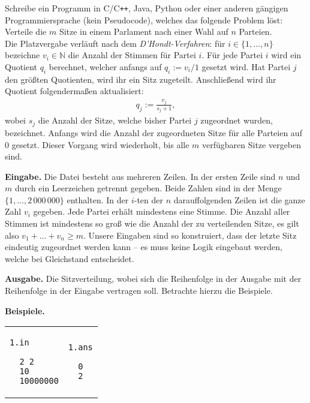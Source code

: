 \documentclass{uebung_cs}
\begin{document}
\begin{aufgabe}
  Schreibe ein Programm in C/C\texttt{++}, Java, Python oder einer anderen gängigen Programmiersprache (kein Pseudocode), welches das folgende Problem löst: 
  Verteile die $m$ Sitze in einem Parlament nach einer Wahl auf $n$ Parteien.\\[0.25cm]
  Die Platzvergabe verläuft nach dem \emph{D'Hondt-Verfahren}:
  für $i \in \{1, \dots, n\}$ bezeichne $v_i \in \mathbb N$ die Anzahl der Stimmen für Partei $i$.
  Für jede Partei $i$ wird ein Quotient $q_i$ berechnet, welcher anfangs auf $q_i := v_i/1$ gesetzt wird.
  Hat Partei $j$ den größten Quotienten, wird ihr ein Sitz zugeteilt.
  Anschließend wird ihr Quotient folgendermaßen aktualisiert:
  \begin{align*}
      q_j := \frac{v_j}{s_j + 1},
  \end{align*}
  wobei $s_j$ die Anzahl der Sitze, welche bisher Partei $j$ zugeordnet wurden, bezeichnet.
  Anfangs wird die Anzahl der zugeordneten Sitze für alle Parteien auf $0$ gesetzt.
  Dieser Vorgang wird wiederholt, bis alle $m$ verfügbaren Sitze vergeben sind.
  
  \textbf{Eingabe.}
  Die Datei besteht aus mehreren Zeilen.
  In der ersten Zeile sind $n$ und $m$ durch ein Leerzeichen getrennt gegeben.
  Beide Zahlen sind in der Menge $\{1, \dots, 2\,000\,000\}$ enthalten.
  In der $i$-ten der $n$ darauffolgenden Zeilen ist die ganze Zahl $v_i$ gegeben.
  Jede Partei erhält mindestens eine Stimme.
  Die Anzahl aller Stimmen ist mindestens so groß wie die Anzahl der zu verteilenden Sitze, es gilt also $v_1 + \dots + v_n \geq m$.
  Unsere Eingaben sind so konstruiert, dass der letzte Sitz eindeutig zugeordnet werden kann -- es muss keine Logik eingebaut werden, welche bei Gleichstand entscheidet.
  
  \textbf{Ausgabe.}
  Die Sitzverteilung, wobei sich die Reihenfolge in der Ausgabe mit der Reihenfolge in der Eingabe vertragen soll. Betrachte hierzu die Beispiele.
  
  \textbf{Beispiele.}\\
  \begin{tabular}{p{}p{}}
  \texttt{1.in}
  \begin{verbatim}
  2 2
  10
  10000000
  \end{verbatim}
  &
  \texttt{1.ans}
  \begin{verbatim}
  0
  2
  \end{verbatim}
  \end{tabular}
  

\end{aufgabe}
\end{document}
